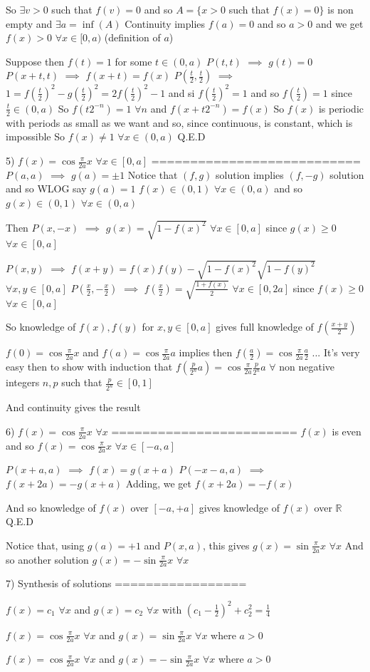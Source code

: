 \begin{solution}
So $\exists v>0$ such that $f(v)=0$ and so $A=\{x>0$ such that $f(x)=0\}$ is non empty and $\exists a=\inf(A)$
Continuity implies $f(a)=0$ and so $a>0$ and we get $f(x)>0$ $\forall x\in[0,a)$ (definition of $a$)

Suppose then $f(t)=1$ for some $t\in (0,a)$
$P(t,t)$ $\implies$ $g(t)=0$
$P(x+t,t)$ $\implies$ $f(x+t)=f(x)$
$P(\frac t2,\frac t2)$ $\implies$ $1=f(\frac t2)^2-g(\frac t2)^2=2f(\frac t2)^2-1$ and si $f(\frac t2)^2=1$ and so $f(\frac t2)=1$ since $\frac t2\in(0,a)$
So $f(t2^{-n})=1$ $\forall n$ and $f(x+t2^{-n})=f(x)$ 
So $f(x)$ is periodic with periods as small as we want and so, since continuous, is constant, which is impossible
So $f(x)\ne 1$ $\forall x\in(0,a)$
Q.E.D

5) $f(x)=\cos \frac{\pi}{2a}x$ $\forall x\in[0,a]$
===========================
$P(a,a)$ $\implies$ $g(a)=\pm 1$
Notice that $(f,g)$ solution implies $(f,-g)$ solution and so WLOG say $g(a)=1$
$f(x)\in(0,1)$ $\forall x\in(0,a)$ and so $g(x)\in(0,1)$ $\forall x\in(0,a)$

Then $P(x,-x)$ $\implies$ $g(x)=\sqrt{1-f(x)^2}$ $\forall x\in[0,a]$ since $g(x)\ge 0$ $\forall x\in[0,a]$

$P(x,y)$ $\implies$ $f(x+y)=f(x)f(y)-\sqrt{1-f(x)^2}\sqrt{1-f(y)^2}$ $\forall x,y\in[0,a]$
$P(\frac x2,-\frac x2)$ $\implies$ $f(\frac x2)=\sqrt{\frac{1+f(x)}2}$ $\forall x\in[0,2a]$ since $f(x)\ge 0$ $\forall x\in[0,a]$

So knowledge of $f(x),f(y)$ for $x,y\in[0,a]$ gives full knowledge of $f(\frac {x+y}2)$

$f(0)=\cos \frac{\pi}{2a}x$ and $f(a)=\cos \frac{\pi}{2a}a$ implies then $f(\frac a2)=\cos \frac{\pi}{2a}\frac a2$
...
It's very easy then to show with induction that $f(\frac p{2^n}a)=\cos \frac{\pi}{2a}\frac p{2^n}a$ $\forall$ non negative integers $n,p$ such that $\frac p{2^n}\in[0,1]$

And continuity gives the result

6) $f(x)=\cos \frac{\pi}{2a}x$ $\forall x$
========================
$f(x)$ is even and so $f(x)=\cos \frac{\pi}{2a}x$ $\forall x\in[-a,a]$

$P(x+a,a)$ $\implies$ $f(x)=g(x+a)$
$P(-x-a,a)$ $\implies$ $f(x+2a)=-g(x+a)$
Adding, we get $f(x+2a)=-f(x)$

And so knowledge of $f(x)$ over $[-a,+a]$ gives knowledge of $f(x)$ over $\mathbb R$
Q.E.D

Notice that, using $g(a)=+1$ and $P(x,a)$, this gives $g(x)=\sin \frac{\pi}{2a}x$ $\forall x$
And so another solution $g(x)=-\sin \frac{\pi}{2a}x$ $\forall x$

7) Synthesis of solutions
=================

$f(x)=c_1$ $\forall x$ and $g(x)=c_2$ $\forall x$ with $(c_1-\frac 12)^2+c_2^2=\frac 14$ 

$f(x)=\cos \frac{\pi}{2a}x$ $\forall x$ and $g(x)=\sin \frac{\pi}{2a}x$ $\forall x$ where $a>0$

$f(x)=\cos \frac{\pi}{2a}x$ $\forall x$ and $g(x)=-\sin \frac{\pi}{2a}x$ $\forall x$ where $a>0$
\end{solution}



